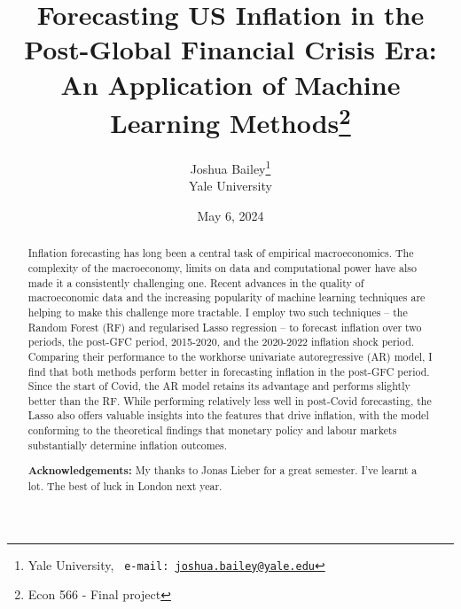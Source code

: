 
\begin{titlepage}

\title{Forecasting US Inflation in the Post-Global Financial Crisis Era: An Application of Machine Learning Methods\footnote{Econ 566 - Final project}} 
\author{Joshua Bailey\thanks{Yale University, \texttt{\ e-mail:  \href{mailto: joshua.bailey@yale.edu}{joshua.bailey@yale.edu}}
}
\\ 
\normalsize{Yale University}
}


\date{May 6, 2024}
\maketitle
\vspace{-20pt}
\begin{abstract}
\begin{adjustwidth}{-10pt}{-10pt}
\thispagestyle{empty}

\noindent Inflation forecasting has long been a central task of empirical macroeconomics. The complexity of the macroeconomy, limits on data and computational power have also made it a consistently challenging one. Recent advances in the quality of macroeconomic data and the increasing popularity of machine learning techniques are helping to make this challenge more tractable. I employ two such techniques -- the Random Forest (RF) and regularised Lasso regression -- to forecast inflation over two periods, the post-GFC period, 2015-2020, and the 2020-2022 inflation shock period. Comparing their performance to the workhorse univariate autoregressive (AR) model, I find that both methods perform better in forecasting inflation in the post-GFC period. Since the start of Covid, the AR model retains its advantage and performs slightly better than the RF. While performing relatively less well in post-Covid forecasting, the Lasso also offers valuable insights into the features that drive inflation, with the model conforming to the theoretical findings that monetary policy and labour markets substantially determine inflation outcomes.  

\textbf{Acknowledgements:} My thanks to Jonas Lieber for a great semester. I've learnt a lot. The best of luck in London next year. 

\end{adjustwidth}
\end{abstract}



\end{titlepage}


\pagebreak

\begin{singlespace}
\hypersetup{linkcolor=black}
\tableofcontents
\listoffigures
\listoftables
\hypersetup{linkcolor=blue}
\end{singlespace}


 